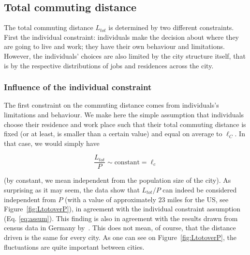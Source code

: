 \subsection{Total commuting distance}
\label{sec:total_length_driven}

The total commuting distance $L_{tot}$ is determined by two different
constraints. First the individual constraint: individuals make the decision
about where they are going to live and work; they have their own behaviour and
limitations. However, the individuals' choices are also limited by the city
structure itself, that is by the respective distributions of jobs and residences across the
city.



\subsubsection{Influence of the individual constraint} 

The first constraint on the commuting distance comes from individuals's limitations and
behaviour. We make here the simple assumption that individuals choose their
residence and work place such that their total commuting distance is fixed (or
at least, is smaller than a certain value) and equal on average to $\ell_C$. In that
case, we would simply have

\begin{equation} 
    \frac{L_{tot}}{P} \sim \text{constant} = \ell_c 
    \label{eq:assum}
\end{equation}

(by constant, we mean independent from the population size of the city). As
surprising as it may seem, the data show that $L_{tot}/P$ can indeed be considered
 independent from $P$ (with a value of approximately $23$ miles for
the US, see Figure~\ref{fig:LtotoverP}), in agreement with the individual
constraint assumption (Eq. \ref{eq:assum}). This finding is also in agreement
with the results drawn from census data in Germany by~\cite{Wilkerson:2014}.
This does not mean, of course, that the distance driven is the same for every
city. As one can see on Figure~\ref{fig:LtotoverP}, the fluctuations are quite
important between cities.  

